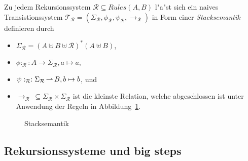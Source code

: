 \documentclass[12pt,a4paper,final]{article}
\begin{document}
Zu jedem Rekursionssystem \mbox{$\mathcal{R} \subseteq \mathit{Rules}(A,B)$} l"a"st sich ein naives Transistionssystem
\mbox{$\mathcal{T}_{\mathcal{R}} = (\Sigma_{\mathcal{R}},\phi_{\mathcal{R}},\psi_{\mathcal{R}},\rightarrow_{\mathcal{R}} )$}
in Form einer \emph{Stacksemantik} definieren durch
\begin{itemize}
\item $\Sigma_{\mathcal{R}} = (A \uplus B \uplus \mathcal{R})^*(A \uplus B)$,
\item $\phi:_{\mathcal{R}}: A \to \Sigma_{\mathcal{R}}, a \mapsto a$,
\item $\psi:_{\mathcal{R}}: \Sigma_{\mathcal{R}} \operatorname{\rightharpoonup} B, b \mapsto b$, und
\item $\rightarrow_{\mathcal{R}}\ \subseteq \Sigma_{\mathcal{R}} \times \Sigma_{\mathcal{R}}$ ist die kleinste
  Relation, welche abgeschlossen ist unter Anwendung der Regeln in Abbildung~\ref{fig:Stacksemantik}.
\end{itemize}
\begin{figure}[htb]
  \centering
  \caption{Stacksemantik}
  \label{fig:Stacksemantik}
\end{figure}



\subsection{Rekursionssysteme und big steps}
\label{sec:Rekursionssysteme_und_big_steps}
\end{document}
